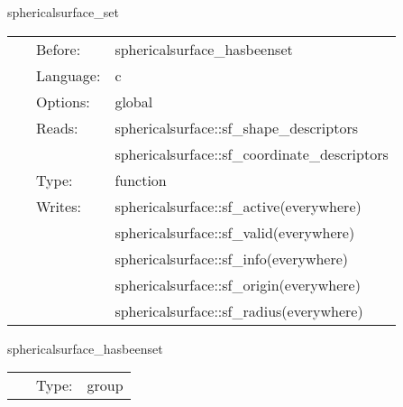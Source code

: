 \vspace{5mm}


\hspace{5mm} sphericalsurface\_set 

\hspace{5mm}{\it set surface radii to be used for initial setup in other thorns } 


\hspace{5mm}

 \begin{tabular*}{160mm}{cll} 
~ & Before:  & sphericalsurface\_hasbeenset \\ 
~ & Language:  & c \\ 
~ & Options:  & global \\ 
~ & Reads:  & sphericalsurface::sf\_shape\_descriptors \\ 
~& ~ &sphericalsurface::sf\_coordinate\_descriptors\\ 
~ & Type:  & function \\ 
~ & Writes:  & sphericalsurface::sf\_active(everywhere) \\ 
~& ~ &sphericalsurface::sf\_valid(everywhere)\\ 
~& ~ &sphericalsurface::sf\_info(everywhere)\\ 
~& ~ &sphericalsurface::sf\_origin(everywhere)\\ 
~& ~ &sphericalsurface::sf\_radius(everywhere)\\ 
\end{tabular*} 


\vspace{5mm}


\hspace{5mm} sphericalsurface\_hasbeenset 

\hspace{5mm}{\it set the spherical surfaces before this group, and use it afterwards } 


\hspace{5mm}

 \begin{tabular*}{160mm}{cll} 
~ & Type:  & group \\ 
\end{tabular*} 


\vspace{5mm}


